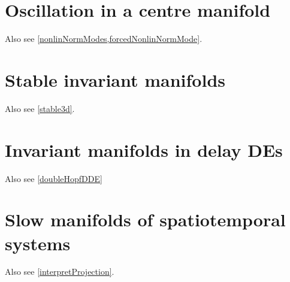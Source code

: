 \documentclass[11pt,a4paper]{refart}
\newcounter{i}
\begin{document}
\section{Oscillation in a centre manifold}
\localtableofcontents

Also see \cref{nonlinNormModes,forcedNonlinNormMode}.









\section{Stable invariant manifolds}
\localtableofcontents

Also see \cref{stable3d}.




\section{Invariant manifolds in delay DEs}
\localtableofcontents

Also see \cref{doubleHopfDDE}





\section{Slow manifolds of spatiotemporal systems}
\localtableofcontents

Also see \cref{interpretProjection}.










\end{document}
